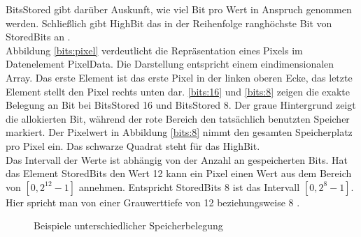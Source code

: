 BitsStored gibt darüber Auskunft, wie viel Bit pro Wert in Anspruch genommen werden. Schließlich gibt HighBit das in der Reihenfolge ranghöchste Bit von StoredBits an \cite[8.1.1]{dicom:structure}.\\
Abbildung \ref{bits:pixel} verdeutlicht die Repräsentation eines Pixels im Datenelement PixelData. Die Darstellung entspricht einem eindimensionalen Array. Das erste Element ist das erste Pixel in der linken oberen Ecke, das letzte Element stellt den Pixel rechts unten dar. \ref{bits:16} und \ref{bits:8} zeigen die exakte Belegung an Bit bei BitsStored 16 und BitsStored 8. Der graue Hintergrund zeigt die allokierten Bit, während der rote Bereich den tatsächlich benutzten Speicher markiert. Der Pixelwert in Abbildung \ref{bits:8} nimmt den gesamten Speicherplatz pro Pixel ein. Das schwarze Quadrat steht für das HighBit.\\
Das Intervall der Werte ist abhängig von der Anzahl an gespeicherten Bits. Hat das Element StoredBits den Wert 12 kann ein  Pixel einen Wert aus dem Bereich von $[0, 2^{12}-1]$ annehmen. Entspricht StoredBits 8 ist das Intervall $[0, 2^8-1]$. Hier spricht man von einer Grauwerttiefe von 12 beziehungsweise 8 \cite[2.2]{handels:mbv}.
\begin{figure}[htb]
\centering
{}
\caption{Beispiele unterschiedlicher Speicherbelegung}
\label{bits}
\end{figure}

